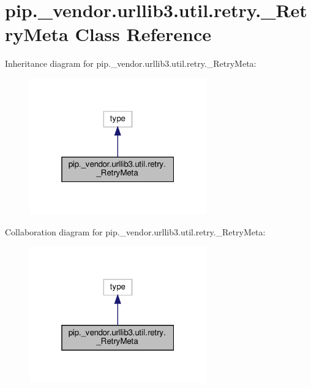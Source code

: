 \hypertarget{classpip_1_1__vendor_1_1urllib3_1_1util_1_1retry_1_1__RetryMeta}{}\section{pip.\+\_\+vendor.\+urllib3.\+util.\+retry.\+\_\+\+Retry\+Meta Class Reference}
\label{classpip_1_1__vendor_1_1urllib3_1_1util_1_1retry_1_1__RetryMeta}


Inheritance diagram for pip.\+\_\+vendor.\+urllib3.\+util.\+retry.\+\_\+\+Retry\+Meta\+:
\nopagebreak
\begin{figure}[H]
\begin{center}
\leavevmode
\includegraphics[width=217pt]{classpip_1_1__vendor_1_1urllib3_1_1util_1_1retry_1_1__RetryMeta__inherit__graph}
\end{center}
\end{figure}


Collaboration diagram for pip.\+\_\+vendor.\+urllib3.\+util.\+retry.\+\_\+\+Retry\+Meta\+:
\nopagebreak
\begin{figure}[H]
\begin{center}
\leavevmode
\includegraphics[width=217pt]{classpip_1_1__vendor_1_1urllib3_1_1util_1_1retry_1_1__RetryMeta__coll__graph}
\end{center}
\end{figure}
